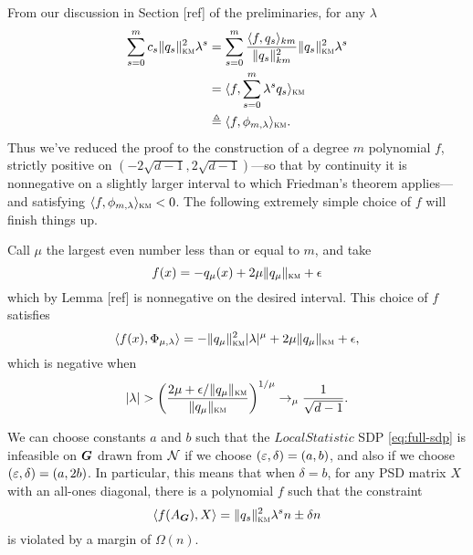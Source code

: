 From our discussion in Section [ref] of the preliminaries, for any $\lambda$
\begin{align*}
    \sum_{s=0}^m c_s \|q_s\|^2_{\textsc{km}}\lambda^s 
    &= \sum_{s=0}^m \frac{\langle f,q_s \rangle_{km}}{\|q_s\|^2_{km}}\|q_s\|^2_{\textsc{km}}\lambda^s \\
    &= \langle f, \sum_{s=0}^m \lambda^s q_s \rangle_{\textsc{km}} \\
    &\triangleq \langle f, \phi_{m,\lambda} \rangle_{\textsc{km}}.
\end{align*}
Thus we've reduced the proof to the construction of a degree $m$ polynomial $f$, strictly positive on $(-2\sqrt{d-1},2\sqrt{d-1})$---so that by continuity it is nonnegative on a slightly larger interval to which Friedman's theorem applies---and satisfying $\langle f, \phi_{m,\lambda}\rangle_{\textsc{km}} < 0$. The following extremely simple choice of $f$ will finish things up.

Call $\mu$ the largest even number less than or equal to $m$, and take 
$$
    f(x) = -q_\mu(x) + 2\mu\|q_\mu\|_{\textsc{km}} + \epsilon
$$
which by Lemma [ref] is nonnegative on the desired interval. This choice of $f$ satisfies
$$
    \langle f(x),\Phi_{\mu,\lambda}\rangle = -\|q_\mu\|^2_{\textsc{km}}|\lambda|^\mu + 2\mu\|q_\mu\|_{\textsc{km}} + \epsilon,
$$
which is negative when
$$
    |\lambda| > \left(\frac{2\mu + \epsilon/\|q_\mu\|_{\textsc{km}}}{\|q_\mu\|_{\textsc{km}}}\right)^{1/\mu} \to_\mu \frac{1}{\sqrt{d-1}}.
$$

\begin{remark}  \label{rem:violation-margin}
    We can choose constants $a$ and $b$ such that the $LocalStatistic$ SDP \eqref{eq:full-sdp} is infeasible on $\boldsymbol{G}$ drawn from $\mathcal{N}$ if we choose $(\varepsilon, \delta) = (a, b)$, and also if we choose $(\varepsilon, \delta) = (a, 2b)$.  In particular, this means that when $\delta = b$, for any PSD matrix $X$ with an all-ones diagonal, there is a polynomial $f$ such that the constraint
    \[
        \langle f(A_{\boldsymbol{G}}), X\rangle = \|q_s\|^2_{\textsc{km}}\lambda^s n \pm \delta n
    \]
    is violated by a margin of $\Omega(n)$. 
\end{remark}

